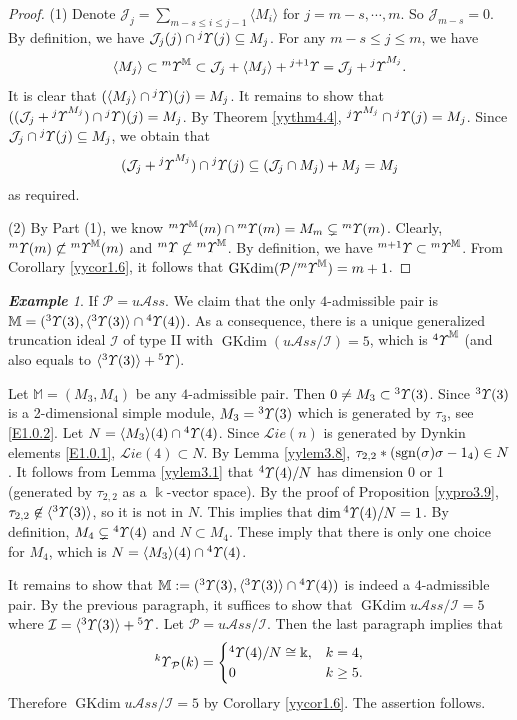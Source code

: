 \documentclass{amsart}
\theoremstyle{definition}
\theoremstyle{remark}
\newtheorem{exm}[thm]{\bf Example}
\numberwithin{equation}{section}
\def\sgn{{\rm sgn}}
\newcommand{\lr}[1]{\langle #1 \rangle}
\newcommand{\up}[1]{{^{#1}{\it \!\Upsilon}}}
\newcommand{\upa}[1]{{^{#1}{\it \!\Upsilon}}}
\def \uas{u\mathcal{A}ss}
\def \Lie{\mathcal{L}ie}
\def \I{\mathcal{I}}
\def \J{\mathcal{J}}
\def \ip{{\mathcal{P}}}
\def \dim{\operatorname{dim}}
\def\gkdim{\operatorname{GKdim}}
\begin{document}
\begin{proof} 
(1) Denote $\J_j=\sum_{m-s\le i\le j-1}\lr{M_i}$ for 
$j=m-s, \cdots, m$. So $\J_{m-s}=0$. By definition, 
we have $\J_j(j)\cap \up{j}(j)\subseteq M_j$. For 
any $m-s\le j\le m$, we have 
$$\langle M_j \rangle \subset \upa{m}^\mathbb{M} \subset 
\J_{j}+ \langle M_{j}\rangle +\up{j+1}=\J_j+
\up{j}^{M_{j}}.$$
It is clear that $(\langle M_j \rangle\cap \up{j})(j)=M_j$. 
It remains to show that $((\J_j+\up{j}^{M_{j}}) 
\cap \up{j})(j)=M_j$. By Theorem \ref{yythm4.4},
$\up{j}^{M_{j}} \cap \up{j}(j)=M_j$. Since $\J_j
\cap \up{j}(j)\subseteq M_j$, we obtain that 
$$ (\J_j+\up{j}^{M_{j}}) \cap \up{j}(j)
\subseteq (\J_{j} \cap M_j)+M_j=M_j$$
as required. 

(2) By Part (1), we know $\up{m}^\mathbb{M}(m)\cap 
\up{m}(m)=M_m\subsetneq \up{m}(m)$. Clearly, 
$\up{m}(m)\not\subset \up{m}^\mathbb{M}(m)$ and 
$\up{m}\not\subset \up{m}^\mathbb{M}$. By definition, 
we have $\up{m+1}\subset \up{m}^\mathbb{M}$. From 
Corollary \ref{yycor1.6}, it follows that 
$\gkdim(\ip/\up{m}^\mathbb{M})=m+1$.
\end{proof}

\begin{exm}
\label{yyexa4.13} 
If $\ip=\uas$. We claim that the only $4$-admissible pair is 
${\mathbb M}=(\up{3}(3), \langle \up{3}(3)\rangle \cap \up{4}(4))$.
As a consequence, there is a unique generalized truncation ideal
$\I$ of type II with $\gkdim (\uas/\I)=5$, which is $\upa{4}^{\mathbb M}$ 
(and also equals to $\lr{\up{3}(3)}+\up{5}$).

Let ${\mathbb M}=(M_3,M_4)$ be any $4$-admissible pair. Then 
$0\neq M_3\subset \up{3}(3)$. Since $\up{3}(3)$ is a 2-dimensional
simple module, $M_3=\up{3}(3)$ which is generated by $\tau_{3}$,
see \eqref{E1.0.2}. Let $N=\lr{M_3}(4)\cap \up{4}(4)$.
Since $\Lie(n)$ is generated by Dynkin elements \eqref{E1.0.1},
$\Lie(4)\subset N$. By Lemma \ref{yylem3.8}, $\tau_{2,2}\ast 
(\sgn(\sigma)\sigma-1_{4})\in N$. It follows from Lemma \ref{yylem3.1}
that $\up{4}(4)/N$ has dimension 0 or 1 (generated by 
$\tau_{2,2}$ as a $\Bbbk$-vector space). By the proof of 
Proposition \ref{yypro3.9}, 
$\tau_{2,2}\not\in\lr{\up{3}(3)}$,
so it is not in $N$. This implies that $\dim \up{4}(4)/N=1$. 
By definition, $M_4\subsetneq \up{4}(4)$ and $N \subset M_4$. 
These imply that there is only one choice for $M_4$, which is 
$N=\lr{M_3}(4)\cap \up{4}(4)$. 

It remains to show that ${\mathbb M}:
=(\up{3}(3), \langle \up{3}(3)\rangle \cap \up{4}(4))$ is indeed a 
$4$-admissible pair. By the previous paragraph, it suffices to show
that $\gkdim \uas/\I=5$ where $\I=\lr{\up{3}(3)}+\up{5}$.
Let $\ip=\uas/\I$. Then the last paragraph implies that
$$\up{k}_{\ip}(k)=\begin{cases}
 \up{4}(4)/N\cong \Bbbk , & k=4,\\
0 & k\geq 5.
\end{cases}
$$
Therefore $\gkdim \uas/\I=5$ by Corollary \ref{yycor1.6}. 
The assertion follows.
\end{exm}
\end{document}

